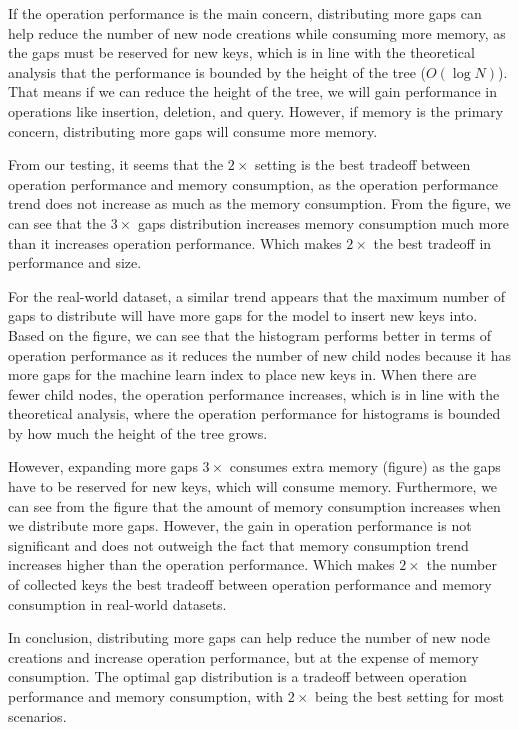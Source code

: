 \documentclass[11pt,a4paper]{article}
\begin{document}
If the operation performance is the main concern, distributing more gaps can help reduce the number of new node creations while consuming more memory, as the gaps must be reserved for new keys, which is in line with the theoretical analysis that the performance is bounded by the height of the tree ($O(\log N)$). That means if we can reduce the height of the tree, we will gain performance in operations like insertion, deletion, and query. However, if memory is the primary concern, distributing more gaps will consume more memory.

From our testing, it seems that the $2\times$ setting is the best tradeoff between operation performance and memory consumption, as the operation performance trend does not increase as much as the memory consumption. From the figure, we can see that the $3\times$ gaps distribution increases memory consumption much more than it increases operation performance. Which makes $2\times$ the best tradeoff in performance and size.

For the real-world dataset, a similar trend appears that the maximum number of gaps to distribute will have more gaps for the model to insert new keys into. Based on the figure, we can see that the histogram performs better in terms of operation performance as it reduces the number of new child nodes because it has more gaps for the machine learn index to place new keys in. When there are fewer child nodes, the operation performance increases, which is in line with the theoretical analysis, where the operation performance for histograms is bounded by how much the height of the tree grows.

However, expanding more gaps $3\times$ consumes extra memory (figure) as the gaps have to be reserved for new keys, which will consume memory. Furthermore, we can see from the figure that the amount of memory consumption increases when we distribute more gaps. However, the gain in operation performance is not significant and does not outweigh the fact that memory consumption trend increases higher than the operation performance. Which makes $2\times$ the number of collected keys the best tradeoff between operation performance and memory consumption in real-world datasets.

In conclusion, distributing more gaps can help reduce the number of new node creations and increase operation performance, but at the expense of memory consumption. The optimal gap distribution is a tradeoff between operation performance and memory consumption, with $2\times$ being the best setting for most scenarios.
\end{document}
